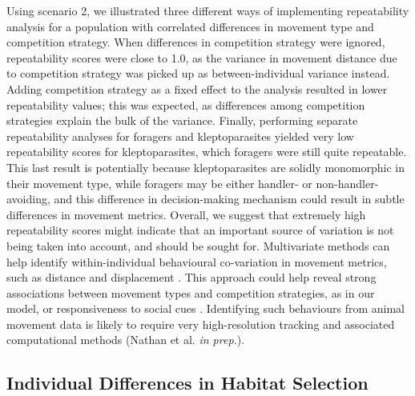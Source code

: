 Using scenario 2, we illustrated three different ways of implementing repeatability analysis for a population with correlated differences in movement type and competition strategy.
When differences in competition strategy were ignored, repeatability scores were close to 1.0, as the variance in movement distance due to competition strategy was picked up as between-individual variance instead.
Adding competition strategy as a fixed effect to the analysis resulted in lower repeatability values; this was expected, as differences among competition strategies explain the bulk of the variance.
Finally, performing separate repeatability analyses for foragers and kleptoparasites yielded very low repeatability scores for kleptoparasites, which foragers were still quite repeatable.
This last result is potentially because kleptoparasites are solidly monomorphic in their movement type, while foragers may be either handler- or non-handler-avoiding, and this difference in decision-making mechanism could result in subtle differences in movement metrics.
Overall, we suggest that extremely high repeatability scores might indicate that an important source of variation is not being taken into account, and should be sought for.
Multivariate methods can help identify within-individual behavioural co-variation in movement metrics, such as distance and displacement \citep{hertel2019,hertel2021}.
This approach could help reveal strong associations between movement types and competition strategies, as in our model, or responsiveness to social cues \citep{strandburg-peshkin2015}.
Identifying such behaviours from animal movement data is likely to require very high-resolution tracking and associated computational methods (Nathan et al. \textit{in prep.}).

\subsection*{Individual Differences in Habitat Selection}

